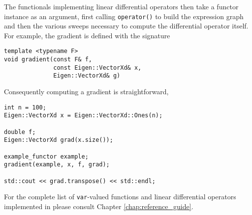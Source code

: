 The functionals implementing linear differential operators then
take a functor instance as an argument, first calling \verb|operator()|
to build the expression graph and then the various sweeps
necessary to compute the differential operator itself.  For example,
the gradient is defined with the signature
%
\begin{verbatim}
template <typename F>
void gradient(const F& f,
              const Eigen::VectorXd& x,
              Eigen::VectorXd& g)
\end{verbatim}
%
Consequently computing a gradient is straightforward,
%
\begin{verbatim}
int n = 100;
Eigen::VectorXd x = Eigen::VectorXd::Ones(n);
  
double f;
Eigen::VectorXd grad(x.size());
  
example_functor example;
gradient(example, x, f, grad);

std::cout << grad.transpose() << std::endl;
\end{verbatim}

For the complete list of \verb|var|-valued functions and linear differential
operators implemented in \nomad please consult Chapter \ref{chap:reference_guide}.
